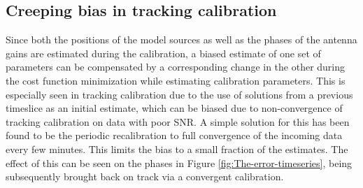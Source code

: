 \documentclass{aa}
\begin{document}
\subsection{Creeping bias in tracking calibration}

Since both  the positions  of the  model sources as  well as  the phases  of the
antenna gains are estimated during the calibration, a biased estimate of one set
of parameters can  be compensated by a corresponding change  in the other during
the cost function minimization  while estimating calibration parameters. This is
especially  seen in  tracking calibration  due to  the use  of solutions  from a
previous  timeslice  as  an  initial  estimate,  which  can  be  biased  due  to
non-convergence  of  tracking calibration  on  data  with  poor SNR.   A  simple
solution  for this  has been  found  to be  the periodic  recalibration to  full
convergence of  the incoming data every few  minutes. This limits the  bias to a
small fraction of the  estimates.  The effect of this can be  seen on the phases
in  Figure \ref{fig:The-error-timeseries},  being subsequently  brought  back on
track via a convergent calibration.




\end{document}
